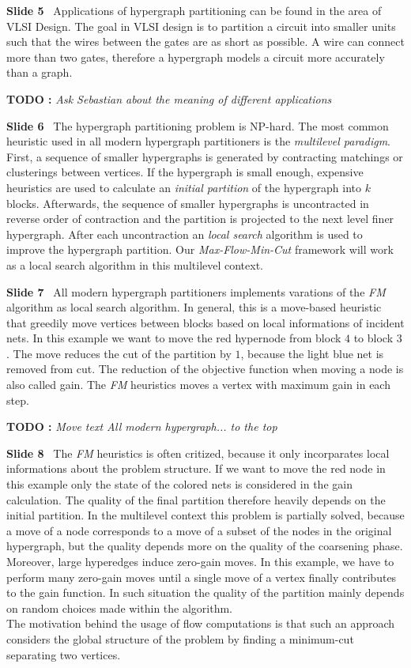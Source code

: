 \documentclass[11pt]{llncs}
\newcounter{todocount}
\newcommand{\todo}[1]{{\color{red}\textbf{TODO \the\value{todocount}:}
        \emph{#1} \addtocounter{todocount}{1}}}
\newcommand{\fakepar}[1]{\medskip\par\textbf{#1}\ }
\begin{document}
\fakepar{Slide 5} Applications of hypergraph partitioning can be found in the area of VLSI Design.
The goal in VLSI design is to partition a circuit into smaller units such that the wires between the
gates are as short as possible. A wire can connect more than two gates, therefore a hypergraph models
a circuit more accurately than a graph.
\todo{Ask Sebastian about the meaning of different applications}

\fakepar{Slide 6} The hypergraph partitioning problem is NP-hard. The most common
heuristic used in all modern hypergraph partitioners is the \emph{multilevel paradigm}.
First, a sequence of smaller hypergraphs is generated by contracting matchings or clusterings
between vertices. If the hypergraph is small enough, expensive heuristics are used
to calculate an \emph{initial partition} of the hypergraph into $k$ blocks. Afterwards,
the sequence of smaller hypergraphs is uncontracted in reverse order of contraction and
the partition is projected to the next level finer hypergraph. After each uncontraction
an \emph{local search} algorithm is used to improve the hypergraph partition. Our 
\emph{Max-Flow-Min-Cut} framework will work as a local search algorithm in this multilevel
context.

\fakepar{Slide 7} All modern hypergraph partitioners implements varations of the \emph{FM}
algorithm as local search algorithm. In general, this is a move-based heuristic that greedily move vertices between blocks
based on local informations of incident nets. In this example we want to move the red hypernode 
from block $4$ to block $3$. The move reduces the cut of the partition by $1$, because the light
blue net is removed from cut. The reduction of the objective function when moving a node is also
called gain. The \emph{FM} heuristics moves a vertex with maximum gain in each step.
\todo{Move text \emph{All modern hypergraph...} to the top}

\fakepar{Slide 8} The \emph{FM} heuristics is often critized, because it only incorparates local
informations about the problem structure. If we want to move the red node in this example only
the state of the colored nets is considered in the gain calculation. The quality of the final partition
therefore heavily depends on the initial partition. In the multilevel context this problem is 
partially solved, because a move of a node corresponds to a move of a subset of the nodes in the
original hypergraph, but the quality depends more on the quality of the coarsening phase.\\
Moreover, large hyperedges induce zero-gain moves. In this example, we have to perform many zero-gain
moves until a single move of a vertex finally contributes to the gain function. In such situation
the quality of the partition mainly depends on random choices made within the algorithm. \\
The motivation behind the usage of flow computations is that such an approach considers the global
structure of the problem by finding a minimum-cut separating two vertices.
\end{document}
